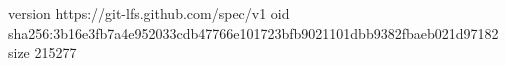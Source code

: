 version https://git-lfs.github.com/spec/v1
oid sha256:3b16e3fb7a4e952033cdb47766e101723bfb9021101dbb9382fbaeb021d97182
size 215277
